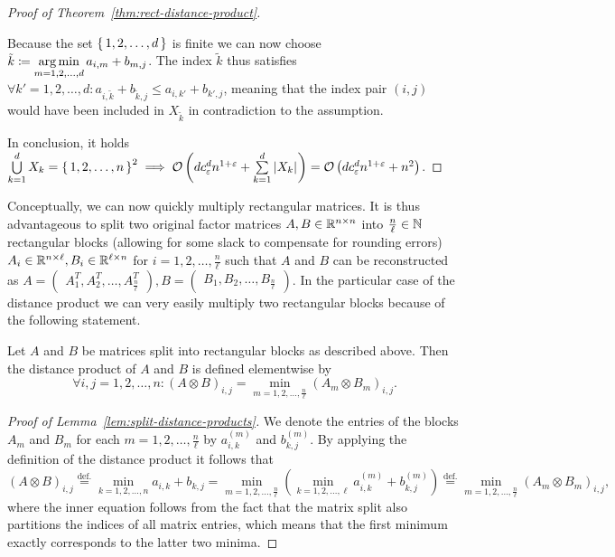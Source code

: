 \begin{proof}[Proof of Theorem~\ref{thm:rect-distance-product}]
\begin{enumerate}
            Because the set $\left\{\,1, 2, \dots, d\,\right\}$ is finite we can now choose $\tilde{k} \coloneqq \operatorname*{arg\,min}\limits_{m = 1, 2, \dots, d} a_{i, m} + b_{m, j}$.
            The index $\tilde{k}$ thus satisfies $\forall k' = 1, 2, \dots, d: a_{i, \tilde{k}} + b_{\tilde{k}, j} \leq a_{i, k'} + b_{k', j}$, meaning that the index pair $(i, j)$ would have been included in $X_{\tilde{k}}$ in contradiction to the assumption. \Lightning{}
    \end{enumerate}
    In conclusion, it holds $\bigcup\limits_{k = 1}^d X_k = \left\{\,1, 2, \dots, n\,\right\}^2 \implies \mathcal{O}\left( d c_\varepsilon^d n^{1 + \varepsilon} + \sum\limits_{k = 1}^d \left\lvert X_k\right\rvert_{} \right) = \mathcal{O}\left( d c_\varepsilon^d n^{1 + \varepsilon} + n^2 \right)$.
\end{proof}

Conceptually, we can now quickly multiply rectangular matrices.
It is thus advantageous to split two original factor matrices $A, B \in \mathbb{R}^{n \times n}$ into $\frac{n}{\ell} \in \mathbb{N}$ rectangular blocks (allowing for some slack to compensate for rounding errors) $A_i \in \mathbb{R}^{n \times \ell}, B_i \in \mathbb{R}^{\ell \times n}$ for $i = 1, 2, \dots, \frac{n}{\ell}$ such that $A$ and $B$ can be reconstructed as $A = \begin{pmatrix}
        A_1^T, A_2^T, \dots, A_{\frac{n}{\ell}}^T
    \end{pmatrix},
    B = \begin{pmatrix}
        B_1, B_2, \dots, B_{\frac{n}{\ell}}
    \end{pmatrix}$.
In the particular case of the distance product we can very easily multiply two rectangular blocks because of the following statement.

\begin{lemma}\label{lem:split-distance-products}
    Let $A$ and $B$ be matrices split into rectangular blocks as described above.
    Then the distance product of $A$ and $B$ is defined elementwise by
    \[
        \forall i, j = 1, 2, \dots, n: {(A \otimes B)}_{i, j} = \min\limits_{m = 1, 2, \dots, \frac{n}{\ell}} {(A_m \otimes B_m)}_{i, j}.
    \]
\end{lemma}

\begin{proof}[Proof of Lemma~\ref{lem:split-distance-products}]
    We denote the entries of the blocks $A_m$ and $B_m$ for each $m = 1, 2, \dots, \frac{n}{\ell}$ by $a_{i, k}^{(m)}$ and $b_{k, j}^{(m)}$.
    By applying the definition of the distance product it follows that
    \[
        {(A \otimes B)}_{i, j} \overset{\text{def.}}{=} \min\limits_{k = 1, 2, \dots, n} a_{i, k} + b_{k, j} = \min\limits_{m = 1, 2, \dots, \frac{n}{\ell}} \left( \min\limits_{k = 1, 2, \dots, \ell} a_{i, k}^{(m)} + b_{k, j}^{(m)} \right) \overset{\text{def.}}{=} \min\limits_{m = 1, 2, \dots, \frac{n}{\ell}} {(A_m \otimes B_m)}_{i, j},
    \]
    where the inner equation follows from the fact that the matrix split also partitions the indices of all matrix entries, which means that the first minimum exactly corresponds to the latter two minima.
\end{proof}

